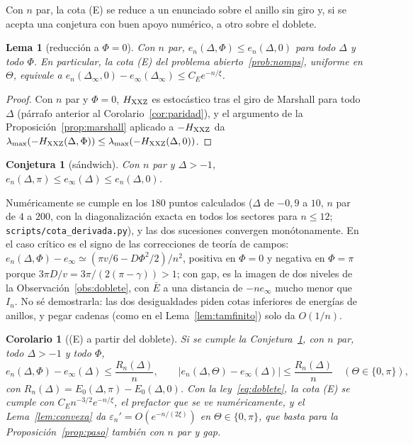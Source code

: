 \documentclass[11pt,a4paper]{article}
\newtheorem{lema}[teorema]{Lema}
\newtheorem{corolario}[teorema]{Corolario}
\newtheorem{conjetura}[teorema]{Conjetura}
\theoremstyle{remark}
\begin{document}
Con $n$ par, la cota (E) se reduce a un enunciado sobre el anillo sin giro y, si se acepta una
conjetura con buen apoyo numérico, a otro sobre el doblete.

\begin{lema}[reducción a $\Phi=0$]\label{lem:phi0}
Con $n$ par, $e_n(\Delta,\Phi)\le e_n(\Delta,0)$ para todo $\Delta$ y todo $\Phi$. En particular, la
cota (E) del problema abierto~\ref{prob:nomps}, uniforme en $\Theta$, equivale a
$e_n(\Delta_\infty,0)-e_\infty(\Delta_\infty)\le C_Ee^{-n/\xi}$.
\end{lema}

\begin{proof}
Con $n$ par y $\Phi=0$, $H_{\rm XXZ}$ es estocástico tras el giro de Marshall para todo $\Delta$
(párrafo anterior al Corolario~\ref{cor:paridad}), y el argumento de la
Proposición~\ref{prop:marshall} aplicado a $-H_{\rm XXZ}$ da
$\lambda_{\max}(-H_{\rm XXZ}(\Delta,\Phi))\le\lambda_{\max}(-H_{\rm XXZ}(\Delta,0))$.
\end{proof}

\begin{conjetura}[sándwich]\label{conj:sandwich}
Con $n$ par y $\Delta>-1$, $e_n(\Delta,\pi)\le e_\infty(\Delta)\le e_n(\Delta,0)$.
\end{conjetura}

Numéricamente se cumple en los $180$ puntos calculados ($\Delta$ de $-0{,}9$ a $10$, $n$ par de $4$ a
$200$, con la diagonalización exacta en todos los sectores para $n\le12$;
\texttt{scripts/cota\_derivada.py}), y las dos sucesiones convergen monótonamente. En el caso crítico es
el signo de las correcciones de teoría de campos: $e_n(\Delta,\Phi)-e_\infty\simeq(\pi v/6-D\Phi^2/2)/n^2$,
positiva en $\Phi=0$ y negativa en $\Phi=\pi$ porque $3\pi D/v=3\pi/(2(\pi-\gamma))>1$; con gap, es la
imagen de dos niveles de la Observación~\ref{obs:doblete}, con $\bar E$ a una distancia de $-ne_\infty$
mucho menor que $I_n$. No sé demostrarla: las dos desigualdades piden cotas inferiores de energías de
anillos, y pegar cadenas (como en el Lema~\ref{lem:tamfinito}) solo da $O(1/n)$.

\begin{corolario}[(E) a partir del doblete]\label{cor:sandwich}
Si se cumple la Conjetura~\ref{conj:sandwich}, con $n$ par, todo $\Delta>-1$ y todo $\Phi$,
\[
  e_n(\Delta,\Phi)-e_\infty(\Delta)\le\frac{R_n(\Delta)}n,\qquad
  |e_n(\Delta,\Theta)-e_\infty(\Delta)|\le\frac{R_n(\Delta)}n\quad(\Theta\in\{0,\pi\}),
\]
con $R_n(\Delta)=E_0(\Delta,\pi)-E_0(\Delta,0)$. Con la ley~\eqref{eq:doblete}, la cota (E) se cumple
con $C_En^{-3/2}e^{-n/\xi}$, el prefactor que se ve numéricamente, y el Lema~\ref{lem:convexa} da
$\varepsilon_n'=O(e^{-n/(2\xi)})$ en $\Theta\in\{0,\pi\}$, que basta para la
Proposición~\ref{prop:paso} también con $n$ par y gap.
\end{corolario}
\end{document}
